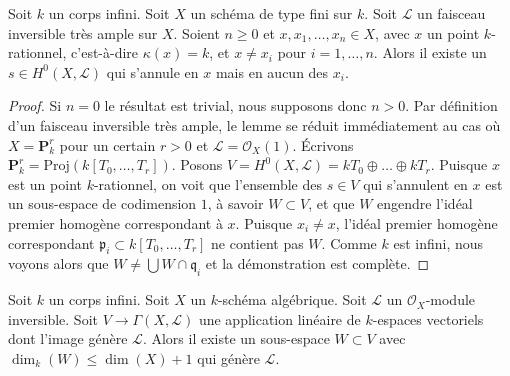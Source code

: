 \begin{lemma}
\label{lemma-very-ample-vanish-at-point}
Soit $k$ un corps infini. Soit $X$
un schéma de type fini sur $k$. Soit $\mathcal{L}$
un faisceau inversible très ample sur $X$. Soient
$n \geq 0$ et $x, x_1, \ldots, x_n \in X$, avec
$x$ un point $k$-rationnel, c'est-à-dire $\kappa(x) = k$,
et $x \not = x_i$ pour $i = 1, \ldots, n$. Alors il existe un $s
\in H^0(X, \mathcal{L})$ qui s'annule en $x$ mais en aucun des $x_i$.
\end{lemma}

\begin{proof}
Si $n = 0$ le résultat est trivial, nous supposons donc $n >
0$. Par définition d'un faisceau inversible très ample, le
lemme se réduit immédiatement au cas où $X = \mathbf{P}^r_k$
pour un certain $r > 0$ et $\mathcal{L} = \mathcal{O}_X(1)$.
Écrivons $\mathbf{P}^r_k = \text{Proj}(k[T_0, \ldots, T_r])$.
Posons $V = H^0(X, \mathcal{L}) = kT_0 \oplus \ldots \oplus
kT_r$. Puisque $x$ est un point $k$-rationnel, on voit que
l'ensemble des $s \in V$ qui s'annulent en $x$ est un sous-espace
de codimension $1$, à savoir $W \subset V$, et que $W$ engendre l'idéal premier
homogène correspondant à $x$. Puisque $x_i \not = x$, l'idéal premier
homogène correspondant $\mathfrak p_i \subset k[T_0, \ldots, T_r]$
ne contient pas $W$. Comme $k$ est infini, nous voyons alors que $W
\not = \bigcup W \cap \mathfrak q_i$ et la démonstration est complète.
\end{proof}

\begin{lemma}
\label{lemma-generated-by-dim-plus-1-sections}
Soit $k$ un corps infini. Soit $X$ un $k$-schéma
algébrique. Soit $\mathcal{L}$ un $\mathcal{O}_X$-module
inversible. Soit $V \to \Gamma(X, \mathcal{L})$ une application
linéaire de $k$-espaces vectoriels dont l'image génère $\mathcal{L}$. Alors il existe
un sous-espace $W \subset V$ avec $\dim_k(W) \leq \dim(X) + 1$ qui génère $\mathcal{L}$.
\end{lemma}

